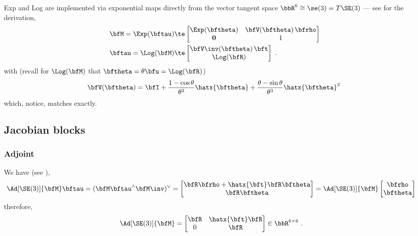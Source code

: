 Exp and Log are implemented via exponential maps directly from the vector tangent space $\bbR^6\cong\se(3)=\mtan{\SE(3)}$ ---  see \cite{EADE-Lie} for the derivation,
%
\begin{align}
  \bfM = \Exp(\bftau) 
    &\te \begin{bmatrix}\Exp(\bth) & \bfV(\bth)\,\bfrho \\ \bf0 & 1  \end{bmatrix} \label{equ:SE3_Exp} \\
  \bftau = \Log(\bfM) 
    &\te \begin{bmatrix} \bfV\inv(\bth)\, \bft \\ \Log(\bfR) \end{bmatrix}~.
\end{align}
%
with (recall for $\Log(\bfM)$ that $\bth=\theta\bfu=\Log(\bfR)$)
%
\begin{align}
\bfV(\bth) = \bfI 
  + \frac{1-\cos\theta}{\theta^2}\hatx{\bftheta}
  + \frac{\theta-\sin\theta}{\theta^3}\hatx{\bftheta}^2
~
\end{align}
%
which, notice, matches  exactly.

\subsection{Jacobian blocks}
\label{sec:derivatives_SE3}

\subsubsection{Adjoint}

We have (see ),
%
\begin{align}
\Ad[\SE(3)]{\bfM}\bftau 
  &= (\bfM\bftau^\wedge\bfM\inv)^\vee \notag 
  = \begin{bmatrix}
  \bfR\bfrho+\hatx{\bft}\bfR\bth \\
  \bfR\bth
  \end{bmatrix} \notag 
  = \Ad[\SE(3)]{\bfM}\begin{bmatrix}
  \bfrho \\ \bth
  \end{bmatrix} \notag 
\end{align}
%
therefore,
%
\begin{align}
  \Ad[\SE(3)]{\bfM} &= \begin{bmatrix}
  \bfR & \hatx{\bft}\bfR \\ 0 & \bfR
  \end{bmatrix} \in \bbR^{6\times6}
  ~.
\end{align}

